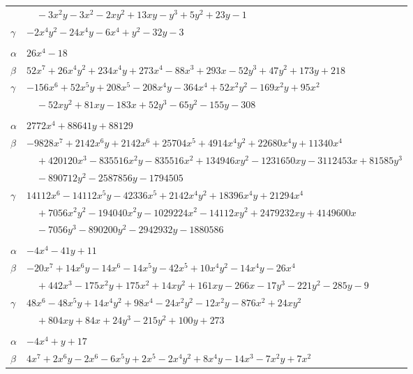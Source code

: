 \documentclass[11pt]{article}
\begin{document}
\begin{longtable}{@{}ll@{}}
 & $\quad -3x^{2}y-3x^{2}-2xy^{2}+13xy-y^{3}+5y^{2}+23y-1$\\
$\gamma$ & $-2x^{4}y^{2}-24x^{4}y-6x^{4}+y^{2}-32y-3$\\
\addlinespace[3pt]
\multicolumn{2}{@{}l}{$\{i,j\}=\{11,24\}$, $k_{ij}=2^{3}\cdot 3^{2}$}\\
$\alpha$ & $26x^{4}-18$\\
$\beta$ & $52x^{7}+26x^{4}y^{2}+234x^{4}y+273x^{4}-88x^{3}+293x-52y^{3}+47y^{2}+173y+218$\\
$\gamma$ & $-156x^{6}+52x^{5}y+208x^{5}-208x^{4}y-364x^{4}+52x^{2}y^{2}-169x^{2}y+95x^{2}$\\
 & $\quad -52xy^{2}+81xy-183x+52y^{3}-65y^{2}-155y-308$\\
\addlinespace[3pt]
\multicolumn{2}{@{}l}{$\{i,j\}=\{11,28\}$, $k_{ij}=2^{11}$}\\
$\alpha$ & $2772x^{4}+88641y+88129$\\
$\beta$ & $-9828x^{7}+2142x^{6}y+2142x^{6}+25704x^{5}+4914x^{4}y^{2}+22680x^{4}y+11340x^{4}$\\
 & $\quad +420120x^{3}-835516x^{2}y-835516x^{2}+134946xy^{2}-1231650xy-3112453x+81585y^{3}$\\
 & $\quad -890712y^{2}-2587856y-1794505$\\
$\gamma$ & $14112x^{6}-14112x^{5}y-42336x^{5}+2142x^{4}y^{2}+18396x^{4}y+21294x^{4}$\\
 & $\quad +7056x^{2}y^{2}-194040x^{2}y-1029224x^{2}-14112xy^{2}+2479232xy+4149600x$\\
 & $\quad -7056y^{3}-890200y^{2}-2942932y-1880586$\\
\addlinespace[3pt]
\multicolumn{2}{@{}l}{$\{i,j\}=\{12,16\}$, $k_{ij}=2$}\\
$\alpha$ & $-4x^{4}-41y+11$\\
$\beta$ & $-20x^{7}+14x^{6}y-14x^{6}-14x^{5}y-42x^{5}+10x^{4}y^{2}-14x^{4}y-26x^{4}$\\
 & $\quad +442x^{3}-175x^{2}y+175x^{2}+14xy^{2}+161xy-266x-17y^{3}-221y^{2}-285y-9$\\
$\gamma$ & $48x^{6}-48x^{5}y+14x^{4}y^{2}+98x^{4}-24x^{2}y^{2}-12x^{2}y-876x^{2}+24xy^{2}$\\
 & $\quad +804xy+84x+24y^{3}-215y^{2}+100y+273$\\
\addlinespace[3pt]
\multicolumn{2}{@{}l}{$\{i,j\}=\{12,20\}$, $k_{ij}=2^{3}\cdot 5$}\\
$\alpha$ & $-4x^{4}+y+17$\\
$\beta$ & $4x^{7}+2x^{6}y-2x^{6}-6x^{5}y+2x^{5}-2x^{4}y^{2}+8x^{4}y-14x^{3}-7x^{2}y+7x^{2}$\\

\end{longtable}
\end{document}
